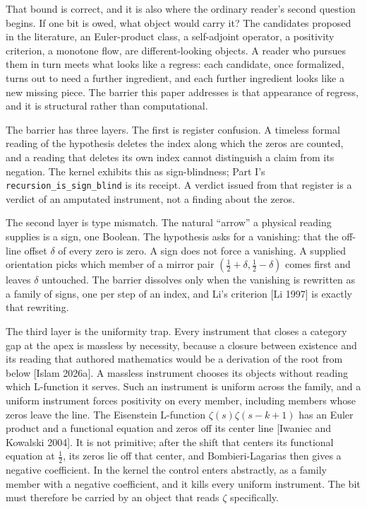 \documentclass[10pt,twocolumn]{article}
\begin{document}
That bound is correct, and it is also where the ordinary reader's second
question begins. If one bit is owed, what object would carry it? The
candidates proposed in the literature, an Euler-product class, a
self-adjoint operator, a positivity criterion, a monotone flow, are
different-looking objects. A reader who pursues them in turn meets what
looks like a regress: each candidate, once formalized, turns out to need
a further ingredient, and each further ingredient looks like a new
missing piece. The barrier this paper addresses is that appearance of
regress, and it is structural rather than computational.

The barrier has three layers. The first is register confusion. A
timeless formal reading of the hypothesis deletes the index along which
the zeros are counted, and a reading that deletes its own index cannot
distinguish a claim from its negation. The kernel exhibits this as
sign-blindness; Part I's \texttt{recursion\_is\_sign\_blind} is its
receipt. A verdict issued from that register is a verdict of an
amputated instrument, not a finding about the zeros.

The second layer is type mismatch. The natural ``arrow'' a physical
reading supplies is a sign, one Boolean. The hypothesis asks for a
vanishing: that the off-line offset \(\delta\) of every zero is zero. A
sign does not force a vanishing. A supplied orientation picks which
member of a mirror pair \((\tfrac12 + \delta, \tfrac12 - \delta)\) comes
first and leaves \(\delta\) untouched. The barrier dissolves only when
the vanishing is rewritten as a family of signs, one per step of an
index, and Li's criterion {[}Li 1997{]} is exactly that rewriting.

The third layer is the uniformity trap. Every instrument that closes a
category gap at the apex is massless by necessity, because a closure
between existence and its reading that authored mathematics would be a
derivation of the root from below {[}Islam 2026a{]}. A massless
instrument chooses its objects without reading which L-function it
serves. Such an instrument is uniform across the family, and a uniform
instrument forces positivity on every member, including members whose
zeros leave the line. The Eisenstein L-function \(\zeta(s)\zeta(s-k+1)\)
has an Euler product and a functional equation and zeros off its center
line {[}Iwaniec and Kowalski 2004{]}. It is not primitive; after the
shift that centers its functional equation at \(\tfrac12\), its zeros
lie off that center, and Bombieri-Lagarias then gives a negative
coefficient. In the kernel the control enters abstractly, as a family
member with a negative coefficient, and it kills every uniform
instrument. The bit must therefore be carried by an object that reads
\(\zeta\) specifically.
\end{document}
